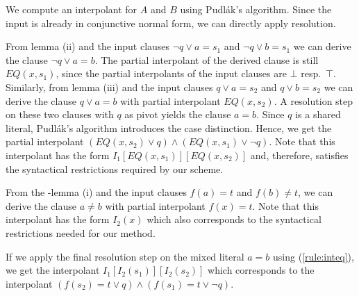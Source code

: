 We compute an interpolant for $A$ and $B$ using Pudl\'ak's algorithm.  Since
the input is already in conjunctive normal form, we can directly apply resolution.
\begin{tacas}
  From lemma (ii) and the input clauses $\lnot q \lor a=s_1$ and $\lnot q \lor
  b=s_1$ we can derive the clause $\lnot q\lor a=b$.  The partial interpolant
  of the derived clause is still $EQ(x,s_1)$, since the partial interpolants
  of the input clauses are $\bot$ resp.\ $\top$.  Similarly, from 
  lemma (iii) and the input clauses $q \lor a=s_2$
  and $q \lor b=s_2$ we can derive the clause $q\lor a=b$ with partial
  interpolant $EQ(x,s_2)$.  A resolution step on these two clauses with $q$ as
  pivot yields the clause $a=b$. Since $q$ is a shared literal, Pudl\'ak's
  algorithm introduces 
  the case distinction.  Hence, we get the partial interpolant
  $(EQ(x,s_2)\lor q)\land(EQ(x,s_1)\lor \lnot q)$.  Note that this interpolant
  has the
  form $I_1[EQ(x,s_1)][EQ(x,s_2)]$ and, therefore, satisfies the syntactical
  restrictions required by our scheme.

  From the \euf-lemma (i) and the input clauses $f(a)=t$ and $f(b)\neq t$, we
  can derive the clause $a\neq b$ with partial interpolant $f(x)=t$.  Note that
  this interpolant has the form $I_2(x)$ which also corresponds to the syntactical
  restrictions needed for our method.

  If we apply the final resolution step on the mixed literal $a=b$ using
  (\ref{rule:inteq}), we get the
  interpolant $I_1[I_2(s_1)][I_2(s_2)]$ which corresponds to the interpolant
  $(f(s_2)=t\lor q)\land(f(s_1)=t\lor \lnot q)$.
\end{tacas}
